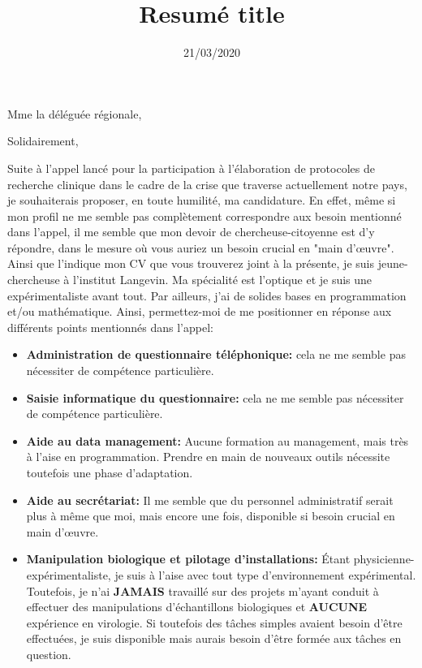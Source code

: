 \documentclass[11pt,a4paper,sans]{moderncv}        %
\title{Resumé title}                               %
\begin{document}
\date{21/03/2020}
\opening{Mme la déléguée régionale,}
\closing{Solidairement,}
\makelettertitle

Suite à l'appel lancé pour la participation à l'élaboration de protocoles de recherche clinique dans le cadre de la crise que traverse actuellement notre pays, je souhaiterais proposer, en toute humilité, ma candidature. En effet, même si mon profil ne me semble pas complètement correspondre aux besoin mentionné dans l'appel, il me semble que mon devoir de chercheuse-citoyenne est d'y répondre, dans le mesure où vous auriez un besoin crucial en "main d’œuvre".\\

Ainsi que l'indique mon CV que vous trouverez joint à la présente, je suis jeune-chercheuse à l'institut Langevin. Ma spécialité est l'optique et je suis une expérimentaliste avant tout. Par ailleurs, j'ai de solides bases en programmation et/ou mathématique. Ainsi, permettez-moi de me positionner en réponse aux différents points mentionnés dans l'appel:

\begin{itemize}
\item  \textbf{Administration de questionnaire téléphonique:} cela ne me semble pas nécessiter de compétence particulière. 
\item  \textbf{Saisie informatique du questionnaire:} cela ne me semble pas nécessiter de compétence particulière. 
\item  \textbf{Aide au data management:} Aucune formation au management, mais très à l'aise en programmation. Prendre en main de nouveaux outils nécessite toutefois une phase d'adaptation.
\item  \textbf{Aide au secrétariat:} Il me semble que du personnel administratif serait plus à même que moi, mais encore une fois, disponible si besoin crucial en main d’œuvre. 
\item \textbf{Manipulation biologique et pilotage d'installations:} Étant physicienne-expérimentaliste, je suis à l'aise avec tout type d'environnement expérimental. Toutefois, je n'ai \textbf{JAMAIS} travaillé sur des projets m'ayant conduit à effectuer des manipulations d'échantillons biologiques et \textbf{AUCUNE} expérience en virologie. Si toutefois des tâches simples avaient besoin d'être effectuées, je suis disponible mais aurais besoin d'être formée aux tâches en question. 
\end{itemize}
\end{document}
